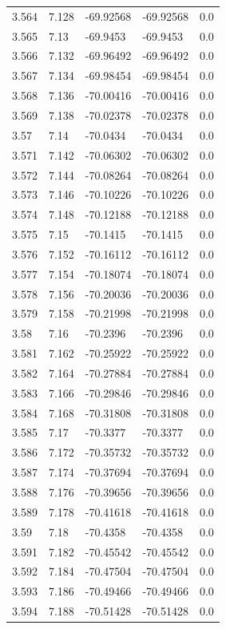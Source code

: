 \begin{tabular}{lllll}
3.564 & 7.128 & -69.92568 & -69.92568 & 0.0 \\
3.565 & 7.13 & -69.9453 & -69.9453 & 0.0 \\
3.566 & 7.132 & -69.96492 & -69.96492 & 0.0 \\
3.567 & 7.134 & -69.98454 & -69.98454 & 0.0 \\
3.568 & 7.136 & -70.00416 & -70.00416 & 0.0 \\
3.569 & 7.138 & -70.02378 & -70.02378 & 0.0 \\
3.57 & 7.14 & -70.0434 & -70.0434 & 0.0 \\
3.571 & 7.142 & -70.06302 & -70.06302 & 0.0 \\
3.572 & 7.144 & -70.08264 & -70.08264 & 0.0 \\
3.573 & 7.146 & -70.10226 & -70.10226 & 0.0 \\
3.574 & 7.148 & -70.12188 & -70.12188 & 0.0 \\
3.575 & 7.15 & -70.1415 & -70.1415 & 0.0 \\
3.576 & 7.152 & -70.16112 & -70.16112 & 0.0 \\
3.577 & 7.154 & -70.18074 & -70.18074 & 0.0 \\
3.578 & 7.156 & -70.20036 & -70.20036 & 0.0 \\
3.579 & 7.158 & -70.21998 & -70.21998 & 0.0 \\
3.58 & 7.16 & -70.2396 & -70.2396 & 0.0 \\
3.581 & 7.162 & -70.25922 & -70.25922 & 0.0 \\
3.582 & 7.164 & -70.27884 & -70.27884 & 0.0 \\
3.583 & 7.166 & -70.29846 & -70.29846 & 0.0 \\
3.584 & 7.168 & -70.31808 & -70.31808 & 0.0 \\
3.585 & 7.17 & -70.3377 & -70.3377 & 0.0 \\
3.586 & 7.172 & -70.35732 & -70.35732 & 0.0 \\
3.587 & 7.174 & -70.37694 & -70.37694 & 0.0 \\
3.588 & 7.176 & -70.39656 & -70.39656 & 0.0 \\
3.589 & 7.178 & -70.41618 & -70.41618 & 0.0 \\
3.59 & 7.18 & -70.4358 & -70.4358 & 0.0 \\
3.591 & 7.182 & -70.45542 & -70.45542 & 0.0 \\
3.592 & 7.184 & -70.47504 & -70.47504 & 0.0 \\
3.593 & 7.186 & -70.49466 & -70.49466 & 0.0 \\
3.594 & 7.188 & -70.51428 & -70.51428 & 0.0 \\

\end{tabular}
